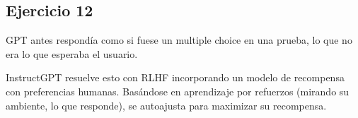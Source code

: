 \documentclass[a4paper,11pt]{article}
\begin{document}
\subsection*{Ejercicio 12}
GPT antes respondía como si fuese un multiple choice en una prueba, lo que no era lo que esperaba el usuario.

InstructGPT resuelve esto con RLHF incorporando un modelo de recompensa con preferencias humanas. Basándose en aprendizaje por refuerzos (mirando su ambiente, lo que responde), se autoajusta para maximizar su recompensa.
\end{document}
